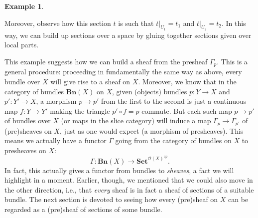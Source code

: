 \documentclass[11pt]{book}
\theoremstyle{definition}
\newtheorem{example}{Example}[section]
\theoremstyle{definition}
\theoremstyle{definition}
\theoremstyle{theorem}
\theoremstyle{definition}
\begin{document}
\begin{example}
\begin{center}
	\end{center}   
	Moreover, observe how this section $t$ is such that $t|_{U_1} = t_1$ and $t|_{U_2} = t_2$. In this way, we can build up sections over a space by gluing together sections given over local parts.\par 
	This example suggests how we can build a sheaf from the presheaf $\Gamma_p$. This is a general procedure: proceeding in fundamentally the same way as above, every bundle over $X$ will give rise to a sheaf on $X$. Moreover, we know that in the category of bundles $\textbf{Bn}(X)$ on $X$, given (objects) bundles $p: Y \rightarrow X$ and $p': Y' \rightarrow X$, a morphism $p \rightarrow p'$ from the first to the second is just a continuous map $f: Y \rightarrow Y'$ making the triangle $p' \circ f = p$ commute. But each such map $p \rightarrow p'$ of bundles over $X$ (or maps in the slice category) will induce a map $\Gamma_p \rightarrow \Gamma_{p'}$ of (pre)sheaves on $X$, just as one would expect (a morphism of presheaves). This means we actually have a functor $\Gamma$ going from the category of bundles on $X$ to presheaves on $X$: 
	\begin{equation*}
	\Gamma: \textbf{Bn}(X) \rightarrow \textbf{Set}^{\mathscr{O}(X)^{op}}. 
	\end{equation*}
	In fact, this actually gives a functor from bundles to \textit{sheaves}, a fact we will highlight in a moment. Earlier, though, we mentioned that we could also move in the other direction, i.e., that \textit{every} sheaf is in fact a sheaf of sections of a suitable bundle. The next section is devoted to seeing how every (pre)sheaf on $X$ can be regarded as a (pre)sheaf of sections of some bundle. 

\end{example}
\end{document}
